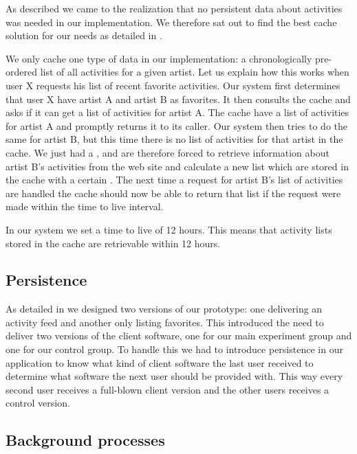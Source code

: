As described we came to the realization that no persistent data
about activities was needed in our implementation.
We therefore sat out to find the best cache solution for our needs as detailed
in .

We only cache one type of data in our implementation:
a chronologically pre-ordered list of all activities for a given artist.
Let us explain how this works
when user X requests his list of recent favorite activities. Our system
first determines that user X have artist A and artist B as
favorites. It then consults the cache and asks if it can get a list of
activities for artist A. The cache have a list of activities for artist A and
promptly returns it to its caller. Our system then tries to do the same for
artist B, but this time there is no list of activities for that artist in the
cache. We just had a , and are therefore forced to retrieve
information about artist B's activities from the \urort{} web site and
calculate a new list which are stored in the cache with a certain
. The next time a request for artist B's list of activities
are handled the cache should now be able to return that list if the request
were made within the time to live interval.

In our system we set a time to live of 12 hours. This means that activity
lists stored in the cache are retrievable within 12 hours.

\subsection{Persistence}

As detailed in
we designed two versions of our prototype: one delivering an activity
feed and another only listing favorites. This introduced the need to deliver
two versions of the client software, one for our main experiment group and one
for our control group. To handle this we had to introduce persistence in our
application to know what kind of client software the last user received to
determine what software the next user should be provided with. This way every
second user receives a full-blown client version and the other users receives
a control version.

\subsection{Background processes}
\label{section:implementation.architecture.background.process}

